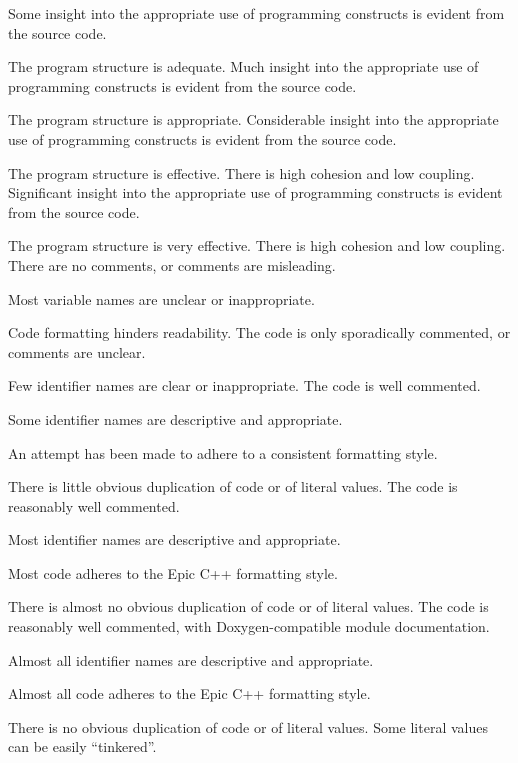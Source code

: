 \documentclass{../../fal_assignment}
\begin{document}
\begin{markingrubric}
        \grade Some insight into the appropriate use of programming constructs is evident from the source code.
            \par The program structure is adequate.
        \grade Much insight into the appropriate use of programming constructs is evident from the source code.
            \par The program structure is appropriate.
        \grade Considerable insight into the appropriate use of programming constructs is evident from the source code.
            \par The program structure is effective. There is high cohesion and low coupling.
        \grade Significant insight into the appropriate use of programming constructs is evident from the source code.
            \par The program structure is very effective. There is high cohesion and low coupling.
%
        \grade\fail There are no comments, or comments are misleading.
            \par Most variable names are unclear or inappropriate.
            \par Code formatting hinders readability.
        \grade The code is only sporadically commented, or comments are unclear.
            \par Few identifier names are clear or inappropriate.
        \grade The code is well commented.
            \par Some identifier names are descriptive and appropriate.
            \par An attempt has been made to adhere to a consistent formatting style.
             \par There is little obvious duplication of code or of literal values.           
        \grade The code is reasonably well commented.
            \par Most identifier names are descriptive and appropriate.
            \par Most code adheres to the Epic C++ formatting style.
             \par There is almost no obvious duplication of code or of literal values.   
        \grade The code is reasonably well commented, with Doxygen-compatible module documentation.
            \par Almost all identifier names are descriptive and appropriate.
            \par Almost all code adheres to the Epic C++ formatting style.
             \par There is no obvious duplication of code or of literal values. Some literal values can be easily ``tinkered''. 

\end{markingrubric}
\end{document}
